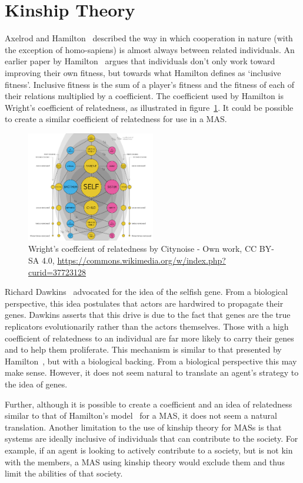 \documentclass[]{final_report}
\begin{document}
\section{Kinship Theory}
\label{sec:kin}
Axelrod and Hamilton~\cite{evolution_of_cooperation} described the way in which cooperation in nature (with the exception of homo-sapiens) is almost always between related individuals. An earlier paper by Hamilton~\cite{kinhamilton} argues that individuals don't only work toward improving their own fitness, but towards what Hamilton defines as `inclusive fitness'. Inclusive fitness is the sum of a player's fitness and the fitness of each of their relations multiplied by a coefficient. The coefficient used by Hamilton is Wright's coefficient of relatedness, as illustrated in figure~\ref{fig:coefrelate}. It could be possible to create a similar coefficient of relatedness for use in a MAS.
\begin{figure}
	\center
	\includegraphics[width=0.5\textwidth]{coefrelate.png}
	\caption{Wright's coeffcient of relatedness by Citynoise - Own work, CC BY-SA 4.0, \url{https://commons.wikimedia.org/w/index.php?curid=37723128}}
	\label{fig:coefrelate}
\end{figure}
\par
Richard Dawkins~\cite{selfish_gene} advocated for the idea of the selfish gene. From a biological perspective, this idea postulates that actors are hardwired to propagate their genes. Dawkins asserts that this drive is due to the fact that genes are the true replicators evolutionarily rather than the actors themselves. Those with a high coefficient of relatedness to an individual are far more likely to carry their genes and to help them proliferate. This mechanism is similar to that presented by Hamilton~\cite{kinhamilton}, but with a biological backing. From a biological perspective this may make sense. However, it does not seem natural to translate an agent's strategy to the idea of genes.\par
Further, although it is possible to create a coefficient and an idea of relatedness similar to that of Hamilton's model~\cite{kinhamilton} for a MAS, it does not seem a natural translation. Another limitation to the use of kinship theory for MASs is that systems are ideally inclusive of individuals that can contribute to the society. For example, if an agent is looking to actively contribute to a society, but is not kin with the members, a MAS using kinship theory would exclude them and thus limit the abilities of that society.\par
\end{document}
